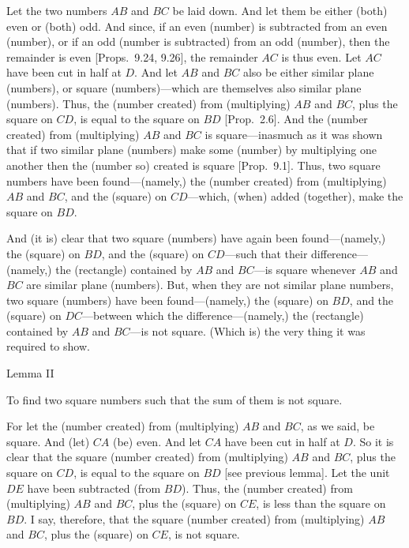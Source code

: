 Let the two numbers $AB$ and $BC$ be laid down. And let them
be either (both)  even or (both) odd. And since, if an even (number) is subtracted
from an even (number), or if an odd (number is subtracted) from an odd
(number), then the remainder is even [Props.~9.24, 9.26], the remainder $AC$ is thus even. Let
$AC$ have been cut in half at $D$. And let $AB$ and $BC$ also be
either similar plane (numbers), or square (numbers)---which are themselves
also similar plane (numbers). Thus, the (number created) from (multiplying)  $AB$ and
$BC$, plus the square on $CD$, is equal to the square on $BD$ [Prop.~2.6].  And the (number created) from (multiplying) $AB$ and $BC$ is square---inasmuch as it was shown that
if two similar plane (numbers) make some (number) by multiplying
one another then the (number so) created is square [Prop.~9.1]. Thus, two square numbers have been
found---(namely,) the (number created) from (multiplying) $AB$ and $BC$,
and the (square) on $CD$---which, (when) added (together),
make the square on $BD$.

And (it is) clear that two square (numbers) have again been found---(namely,) the (square) on $BD$, and the (square) on $CD$---such that their difference---(namely,) the (rectangle) contained by $AB$ and $BC$---is  square
whenever $AB$ and $BC$ are similar plane (numbers). But, when they are
not similar plane numbers, two square (numbers) have been found---(namely,) the (square) on $BD$, and the (square) on $DC$---between which the difference---(namely,) the (rectangle) contained by $AB$ and $BC$---is
not  square. (Which is) the very thing it was required to show.


\begin{center}
{\large Lemma II}
\end{center}

To find two square numbers such that
the sum of them is not square.

\epsfysize=0.4in
\centerline{}

For let the (number created) from (multiplying) $AB$ and $BC$, as we said, be square.  And (let) $CA$ (be) even. And let $CA$ have been
cut in half at $D$. So it is clear that the square (number created) from
(multiplying) $AB$ and $BC$, plus the square on $CD$, is equal to the
square on $BD$ [see previous lemma]. Let the unit $DE$ have been subtracted (from $BD$).
Thus, the (number created) from (multiplying) $AB$ and $BC$, plus
the (square) on $CE$, is less than the square on $BD$. I say, therefore,
that the square (number created) from (multiplying) $AB$ and $BC$, plus the
(square) on $CE$, is not square.

